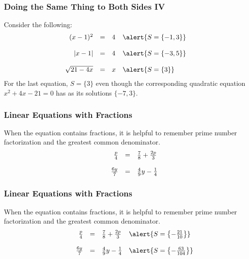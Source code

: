 \documentclass[xcolor=dvipsnames]{beamer}
\begin{document}
\begin{frame}
  \frametitle{Doing the Same Thing to Both Sides IV}
Consider the following:
\begin{equation}
  \label{eq:peihahto}
  \begin{array}{rcll}
    (x-1)^{2}&=&4&\alert{S=\{-1,3\}} \\
\hspace{.5in} &&& \\
    |x-1|&=&4&\alert{S=\{-3,5\}} \\
\hspace{.5in} &&& \\
    \sqrt{21-4x}&=&x&\alert{S=\{3\}}
  \end{array}
\end{equation}
For the last equation, $S=\{3\}$ even though the corresponding
quadratic equation $x^{2}+4x-21=0$ has as its solutions $\{-7,3\}$.
\end{frame}

\begin{frame}
  \frametitle{Linear Equations with Fractions}
When the equation contains fractions, it is helpful to remember prime
number factorization and the greatest common denominator.
\begin{equation}
  \label{eq:sheekahf}
  \begin{array}{rcl}
\frac{p}{4}&=&\frac{7}{8}+\frac{2p}{3} \\
\hspace{.5in} && \\
\frac{6y}{7}&=&\frac{4}{9}y-\frac{1}{4} \\
  \end{array}
\end{equation}
\end{frame}

\begin{frame}
  \frametitle{Linear Equations with Fractions}
When the equation contains fractions, it is helpful to remember prime
number factorization and the greatest common denominator.
\begin{equation}
  \label{eq:xiupaete}
  \begin{array}{rcll}
\frac{p}{4}&=&\frac{7}{8}+\frac{2p}{3}&\alert{S=\left\{-\frac{21}{10}\right\}} \\
\hspace{.5in} && \\
\frac{6y}{7}&=&\frac{4}{9}y-\frac{1}{4}&\alert{S=\left\{-\frac{63}{104}\right\}} \\
  \end{array}
\end{equation}
\end{frame}
\end{document}
